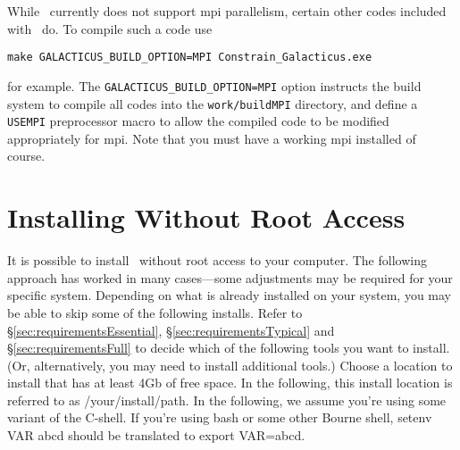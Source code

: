 While \glc\ currently does not support \gls{mpi} parallelism, certain other codes included with \glc\ do. To compile such a code use
\begin{verbatim}
make GALACTICUS_BUILD_OPTION=MPI Constrain_Galacticus.exe
\end{verbatim}
for example. The {\tt GALACTICUS\_BUILD\_OPTION=MPI} option instructs the build system to compile all codes into the {\tt work/buildMPI} directory, and define a {\tt USEMPI} preprocessor macro to allow the compiled code to be modified appropriately for \gls{mpi}. Note that you must have a working \gls{mpi} installed of course.

\section{Installing Without Root Access}

It is possible to install \glc\ without root access to your computer. The following approach has worked in many cases---some adjustments may be required for your specific system. Depending on what is already installed on your system, you may be able to skip some of the following installs. Refer to \S\ref{sec:requirementsEssential}, \S\ref{sec:requirementsTypical} and \S\ref{sec:requirementsFull} to decide which of the following tools you want to install. (Or, alternatively, you may need to install additional tools.) Choose a location to install that has at least 4Gb of free space. In the following, this install location is referred to as {\normalfont \ttfamily /your/install/path}. In the following, we assume you're using some variant of the C-shell. If you're using {\normalfont \ttfamily bash} or some other Bourne shell, {\normalfont \ttfamily setenv VAR abcd} should be translated to {\normalfont \ttfamily export VAR=abcd}.

